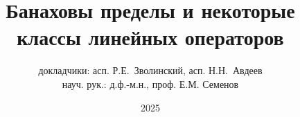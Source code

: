 

\title{
	Банаховы пределы и некоторые классы линейных операторов
}
\author{докладчики: асп. Р.Е.~Зволинский, асп. Н.Н.~Авдеев\\науч. рук.: д.ф.-м.н., проф. Е.М. Семенов}
\date{2025}

\maketitle

